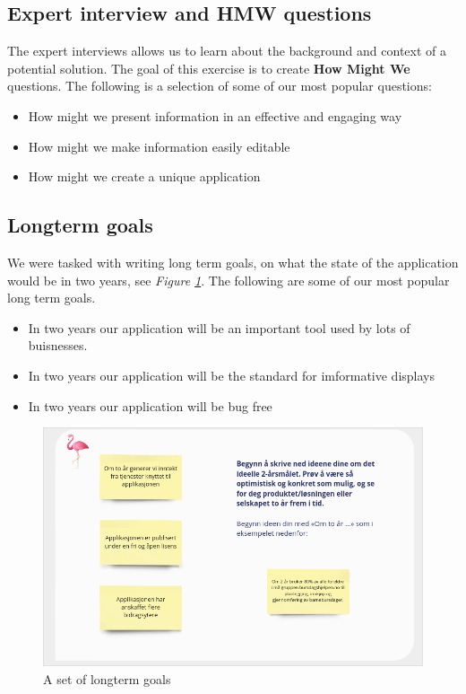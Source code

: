 \documentclass[12pt]{article}
\begin{document}
\subsection{Expert interview and HMW\cite{WhatHowMight} questions}
The expert interviews allows us to learn about the background and context of a potential solution.
The goal of this exercise is to create \textbf{How Might We} questions.
The following is a selection of some of our most popular questions:
\begin{itemize}
    \item How might we present information in an effective and engaging way
    \item How might we make information easily editable
    \item How might we create a unique application
\end{itemize}
\subsection{Longterm goals}
We were tasked with writing long term goals, on what the state of the application would be in two years, see \textit{Figure \ref{fig:LO}}.
The following are some of our most popular long term goals. 
\begin{itemize}
    \item In two years our application will be an important tool used by lots of buisnesses.
    \item In two years our application will be the standard for imformative displays
    \item In two years our application will be bug free
\end{itemize}
\begin{figure}[h]
    \begin{adjustwidth}{-1in}{-1in}
        \centering
        \includegraphics[scale=0.3]{longterm.png}
        \caption{A set of longterm goals}
        \label{fig:LO}
    \end{adjustwidth}
\end{figure}
\clearpage
\end{document}
